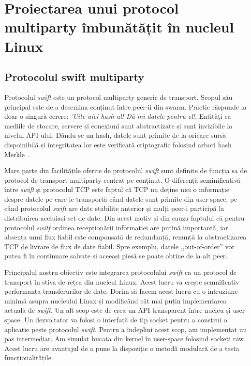 
\chapter{Proiectarea unui protocol multiparty îmbunătățit în nucleul Linux}
\label{chapter:multiparty}

\section{Protocolul swift multiparty}
\label{sec:multiparty:swift}

Protocolul \textit{swift} este un protocol multiparty generic de transport.
Scopul său principal este de a desemina conținut între peer-ii din swarm.
Practic răspunde la doar o singură cerere: \textit{'Uite aici hash-ul!
Dă-mi datele pentru el!}. Entități ca mediile de stocare, servere și
conexiuni sunt abstractizate și sunt invizibile la nivelul API-ului.
Dându-se un hash, datele sunt primite de la oricare sursă dispoinibilă
și integritatea lor este verificată criptografic folosind arbori hash
Merkle~\cite{merkle}.

Mare parte din facilitățile oferite de protocolul \textit{swift} sunt
definite de funcția sa de protocol de transport multiparty centrat pe
conținut. O diferență seminificativă între \textit{swift} și protocolul TCP
este faptul că TCP nu deține nici o informație despre datele pe care le
transportă când datele sunt primite din user-space, pe când protocolul
\textit{swift} are date stabilite anterior și mulți peer-i participă la
distribuirea aceluiași set de date. Din acest motiv și din cauza faptului
că pentru protocolul \textit{switf} ordinea recepționării informației are
puțină importantă, iar absența unui flux fiabil este componsată de redundanță,
renunță la abstractizarea TCP de livrare de flux de date fiabil.
Spre exemplu, datele ,,out-of-order'' vor putea fi în continuare salvate și
aceeași piesă se poate obține de la alt peer.

Principalul nostru obiectiv este integrarea protocolului \textit{swift} ca
un protocol de transport în stiva de rețea din nucleul Linux. Acest lucru
va crește semnificativ performanța transferurilor de date. Dorim să facem
acest lucru cu o intruziune minimă asupra nucleului Linux și modificând cât
mai puțin implementarea actuală de \textit{swift}. Un alt scop este de crea
un API transparent între nucleu și user-space. Un dezvoltator va folosi o
interfață de tip socket pentru a construi o aplicație peste protocolul
\textit{swift}. Pentru a îndeplini acest scop, am implementat un pas
intermediar. Am simulat bucata din kernel în user-space folosind sockeți
raw. Acest lucru are avantajul de a pune la dispoziție o metodă modulară de
a testa funcționalitățile.

